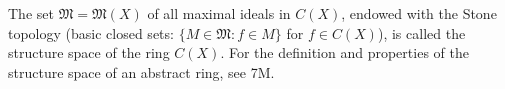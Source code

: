 The set \(\mathfrak{M} = \mathfrak{M}(X)\) of all maximal ideals in \(C(X)\), endowed with the Stone topology (basic closed sets: \(\{M \in \mathfrak{M} : f \in M\}\) for \(f \in C(X)\)), is called the structure space of the ring \(C(X)\). For the definition and properties of the structure space of an abstract ring, see 7M.
